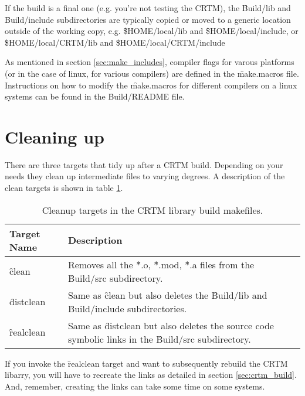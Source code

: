 If the build is a final one (e.g. you're not testing the CRTM), the \f{Build/lib} and \f{Build/include} subdirectories are typically copied or moved to a generic location outside of the working copy, e.g. \f{\$HOME/local/lib} and \f{\$HOME/local/include}, or \f{\$HOME/local/CRTM/lib} and \f{\$HOME/local/CRTM/include}

As mentioned in section \ref{sec:make_includes}, compiler flags for varous platforms (or in the case of linux, for various compilers) are defined in the \f{make.macros} file. Instructions on how to modify the \f{make.macros} for different compilers on a linux systems can be found in the \f{Build/README} file.

\section{Cleaning up}
There are three targets that tidy up after a CRTM build. Depending on your needs they clean up intermediate files to varying degrees. A description of the clean targets is shown in table \ref{tab:clean_up}.

\begin{table}[htb]
  \centering
  \begin{tabular}{p{2.5cm} p{11.5cm}}
    \hline
    \sffamily\textbf{Target Name} & \sffamily\textbf{Description} \\
    \hline\hline
    \f{clean}     & Removes all the \f{*.o}, \f{*.mod}, \f{*.a} files from the \f{Build/src} subdirectory. \\
    \f{distclean} & Same as \f{clean} but also deletes the \f{Build/lib} and \f{Build/include} subdirectories. \\
    \f{realclean} & Same as \f{distclean} but also deletes the source code symbolic links in the \f{Build/src} subdirectory.\\
    \hline
  \end{tabular}
  \caption{Cleanup targets in the CRTM library build makefiles.}
  \label{tab:clean_up}
\end{table}
If you invoke the \f{realclean} target and want to subsequently rebuild the CRTM libarry, you will have to recreate the links as detailed in section \ref{sec:crtm_build}. And, remember, creating the links can take some time on some systems.

